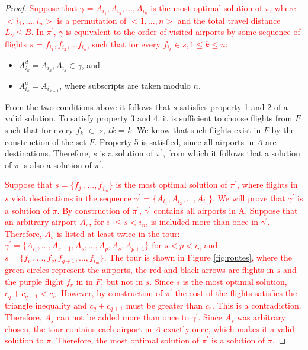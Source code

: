 \documentclass{article}
\theoremstyle{definition}
\begin{document}
\begin{proof}
\textcolor{red}{
Suppose that $\gamma$ = $A_{i_{1}}, A_{i_{2}},...,A_{i_{n}}$ is the most optimal solution of $\pi$, where $<i_{1},...,i_{n}>$ is a permutation of $<1,...,n>$ and the total travel distance $L_{\gamma} \leq B$. In $\pi^{\prime}$, $\gamma$ is equivalent to the order of visited airports by some sequence of flights $s$ = $f_{i_{1}}, f_{i_{2}},...f_{i_{n}}$, such that for every $f_{i_{k}} \in s, 1 \leq k \leq n$:}

\begin{itemize}
\color{red}
\item $ A^{d}_{i_{k}} = A_{i_{k}}, A_{i_{k}} \in \gamma $, and
\item $ A^{a}_{i_{k}} = A_{i_{k+1}}$, where subscripts are taken modulo $n$.
\end{itemize}

From the two conditions above it follows that $s$ satisfies property 1 and 2 of a valid solution. To satisfy property 3 and 4, it is sufficient to choose flights from $F$ such that for every $f_{k}$ $\in$ $s$, $t{k}$ = $k$. We know that such flights exist in $F$ by the construction of the set $F$. Property 5 is satisfied, since all airports in $A$ are destinations. Therefore, $s$ is a solution of $\pi^{\prime}$, from which it follows that a solution of $\pi$ is also a solution of $\pi^{\prime}$.

\textcolor{red}{Suppose that $s = \{f_{j_{1}},...,f_{j_{m}}\}$ is the most optimal solution of $\pi^{\prime}$, where flights in $s$ visit destinations in the sequence $\gamma^{\prime}$ = $\{A_{i_{1}}, A_{i_{2}},...,A_{i_{n}}\}$. We will prove that $\gamma^{\prime}$ is a solution of $\pi$. 
By construction of $\pi^{\prime}$, $\gamma^{\prime}$ contains all airports in A.
Suppose that an arbitrary airport $A_{s}$, for $i_{1} \leq s < i_{n}$, is included more than once in $\gamma^{\prime}$. Therefore, $A_{s}$ is listed at least twice in the tour: $\gamma^{\prime} = \{A_{i_{1}},...,A_{s-1},A_{s},...,A_{p},A_{s},A_{p+1}\}$ for $s < p < i_{n}$ and $s=\{f_{i_{1}},...,f_{q},f_{q+1},...,f_{i_{m}}\}$. The tour is shown in Figure \ref{fig:routes}, where the green circles represent the airports, the red and black arrows are flights in $s$ and the purple flight $f_{r}$ in in $F$, but not in $s$. Since $s$ is the most optimal solution, $c_{q} + c_{q+1} < c_{r}$. However, by construction of $\pi^{\prime}$ the cost of the flights satisfies the triangle inequality and $c_{q} + c_{q+1}$ must be greater than $c_{r}$. This is a contradiction. Therefore, $A_{s}$ can not be added more than once to $\gamma^{\prime}$. Since $A_{s}$ was arbitrary chosen, the tour contains each airport in $A$ exactly once, which makes it a valid solution to $\pi$. Therefore, the most optimal solution of $\pi^{\prime}$ is a solution of $\pi$.}


\end{proof}
\end{document}

